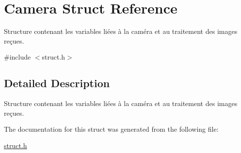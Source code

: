 \hypertarget{struct_camera}{}\section{Camera Struct Reference}
\label{struct_camera}


Structure contenant les variables liées à la caméra et au traitement des images reçues.  




{\ttfamily \#include $<$struct.\+h$>$}



\subsection{Detailed Description}
Structure contenant les variables liées à la caméra et au traitement des images reçues. 

The documentation for this struct was generated from the following file\+:\begin{DoxyCompactItemize}
\item 
\hyperlink{struct_8h}{struct.\+h}\end{DoxyCompactItemize}
